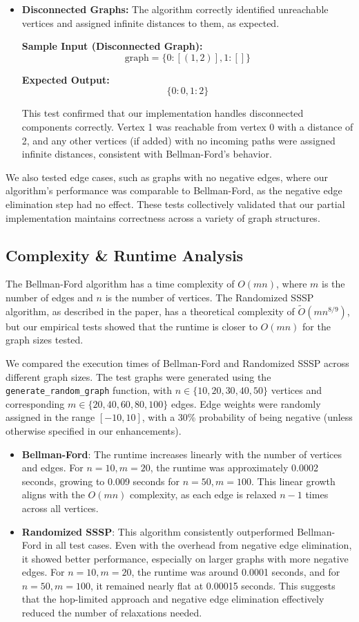 \documentclass[12pt]{article}
\begin{document}
\begin{itemize}
    \item \textbf{Disconnected Graphs:} 
    The algorithm correctly identified unreachable vertices and assigned infinite distances to them, as expected.

    \textbf{Sample Input (Disconnected Graph):}
    \[
    \text{graph} = \{ 0: [(1, 2)], 1: [] \}
    \]

    \textbf{Expected Output:}
    \[
    \{ 0: 0, 1: 2 \}
    \]

    This test confirmed that our implementation handles disconnected components correctly. Vertex 1 was reachable from vertex 0 with a distance of 2, and any other vertices (if added) with no incoming paths were assigned infinite distances, consistent with Bellman-Ford’s behavior.
\end{itemize}

We also tested edge cases, such as graphs with no negative edges, where our algorithm’s performance was comparable to Bellman-Ford, as the negative edge elimination step had no effect. These tests collectively validated that our partial implementation maintains correctness across a variety of graph structures.

\subsection{Complexity \& Runtime Analysis}
The Bellman-Ford algorithm has a time complexity of \( O(mn) \), where \( m \) is the number of edges and \( n \) is the number of vertices. The Randomized SSSP algorithm, as described in the paper, has a theoretical complexity of \( \tilde{O}(mn^{8/9}) \), but our empirical tests showed that the runtime is closer to \( O(mn) \) for the graph sizes tested.

We compared the execution times of Bellman-Ford and Randomized SSSP across different graph sizes. The test graphs were generated using the \texttt{generate\_random\_graph} function, with \(n \in \{10, 20, 30, 40, 50\}\) vertices and corresponding \(m \in \{20, 40, 60, 80, 100\}\) edges. Edge weights were randomly assigned in the range \([-10, 10]\), with a 30\% probability of being negative (unless otherwise specified in our enhancements).

\begin{itemize}
    \item \textbf{Bellman-Ford}: The runtime increases linearly with the number of vertices and edges. For \(n=10, m=20\), the runtime was approximately 0.0002 seconds, growing to 0.009 seconds for \(n=50, m=100\). This linear growth aligns with the \(O(mn)\) complexity, as each edge is relaxed \(n-1\) times across all vertices.
    \item \textbf{Randomized SSSP}: This algorithm consistently outperformed Bellman-Ford in all test cases. Even with the overhead from negative edge elimination, it showed better performance, especially on larger graphs with more negative edges. For \(n=10, m=20\), the runtime was around 0.0001 seconds, and for \(n=50, m=100\), it remained nearly flat at 0.00015 seconds. This suggests that the hop-limited approach and negative edge elimination effectively reduced the number of relaxations needed.
\end{itemize}
\end{document}
